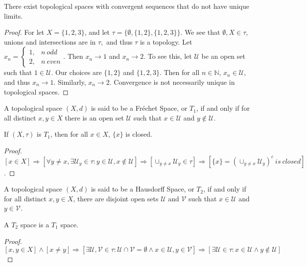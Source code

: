 \documentclass[crop=false,class=book]{standalone}
\begin{document}
\begin{theorem}
There exist topological spaces with convergent sequences that do not have unique limits.
\end{theorem}
\begin{proof}
For let $X = \{1,2,3\}$, and let $\tau = \{\emptyset, \{1,2\},\{1,2,3\}\}$. We see that $\emptyset,X\in \tau$, unions and intersections are in $\tau,$ and thus $\tau$ is a topology. Let $x_n = \begin{cases} 1, & n\ odd \\ 2, & n\ even\end{cases}$. Then $x_n \rightarrow 1$ and $x_n \rightarrow 2$. To see this, let $\mathcal{U}$ be an open set such that $1\in \mathcal{U}$. Our choices are $\{1,2\}$ and $\{1,2,3\}$. Then for all $n\in \mathbb{N}$, $x_n \in \mathcal{U}$, and thus $x_n \rightarrow 1$. Similarly, $x_n \rightarrow 2$. Convergence is not necessarily unique in topological spaces.
\end{proof}
\begin{definition}
A topological space $(X,d)$ is said to be a Fr\'{e}chet Space, or $T_1$, if and only if for all distinct $x,y\in X$ there is an open set $\mathcal{U}$ such that $x\in \mathcal{U}$ and $y\notin \mathcal{U}$.
\end{definition}
\begin{theorem}
If $(X,\tau)$ is $T_1$, then for all $x\in X$, $\{x\}$ is closed.
\end{theorem}
\begin{proof}
$[x\in X]\Rightarrow [\forall y\ne x, \exists \mathcal{U}_y\in \tau:y\in \mathcal{U},x\notin\mathcal{U}]\Rightarrow [\cup_{y\ne x}\mathcal{U}_y\in \tau]\Rightarrow [\{x\}=(\cup_{y\ne x}\mathcal{U}_y)^c\ is\ closed]$.
\end{proof}
\begin{definition}
A topological space $(X,d)$ is said to be a Hausdorff Space, or $T_2$, if and only if for all distinct $x,y\in X$, there are disjoint open sets $\mathcal{U}$ and $\mathcal{V}$ such that $x\in \mathcal{U}$ and $y\in \mathcal{V}$.
\end{definition}
\begin{theorem}
A $T_2$ space is a $T_1$ space.
\end{theorem}
\begin{proof}
$[x,y\in X]\land [x\ne y]\Rightarrow [\exists \mathcal{U},\mathcal{V}\in \tau:\mathcal{U}\cap \mathcal{V}=\emptyset\land x\in \mathcal{U},y\in \mathcal{V}]\Rightarrow [\exists \mathcal{U}\in \tau:x\in \mathcal{U}\land y\notin \mathcal{U}]$
\end{proof}
\end{document}
